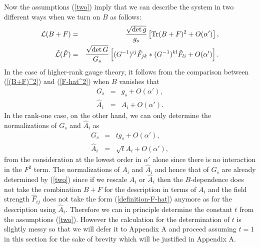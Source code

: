 \documentclass[a4paper,12pt]{article}
\begin{document}
Now the assumptions (\ref{two}) imply that
we can describe the system
in two different ways when we turn on $B$
as follows:
\begin{eqnarray}
{\cal L} (B+F)
&=& \frac{\sqrt{\det g}}{g_s} \left[
{\rm Tr} (B+F)^2
+ O(\alpha') \right],
\label{(B+F)^2} \\
\hat{{\cal L}} (\hat{F})
&=& \frac{\sqrt{\det G}}{G_s} \left[
(G^{-1})^{ij} \hat{F}_{jk} \ast (G^{-1})^{kl} \hat{F}_{li}
+ O(\alpha') \right].
\label{F-hat^2}
\end{eqnarray}
In the case of higher-rank gauge theory, it follows from
the comparison between (\ref{(B+F)^2}) and (\ref{F-hat^2})
when $B$ vanishes that
\begin{eqnarray}
G_s &=& g_s + O(\alpha'),
\label{G_s-lowest} \\
\hat{A}_i &=& A_i + O(\alpha').
\label{A-hat-lowest}
\end{eqnarray}
In the rank-one case, on the other hand, we can only determine
the normalizations of $G_s$ and $\hat{A}_i$ as
\begin{eqnarray}
G_s &=& t g_s + O(\alpha'),
\label{G_s-0}
\\
\hat{A}_i &=&  \sqrt{t} A_i + O(\alpha'),
\label{U1}
\end{eqnarray}
        from the consideration at the lowest order
in $\alpha'$ alone
since there is no interaction in the $F^2$ term.
The normalizations of $A_i$ and $\hat{A}_i$
and hence that of $G_s$ are already determined by (\ref{two})
since if we rescale $A_i$ or $\hat{A}_i$ then the $B$-dependence
does not take the combination $B+F$ for the description
in terms of $A_i$
and the field strength $\hat{F}_{ij}$ does not take the form
(\ref{definition-F-hat}) anymore
as for the description using $\hat{A}_i$.
Therefore we can in principle determine the constant $t$ from
the assumptions (\ref{two}).
However the calculation for the determination of $t$ is
slightly messy so that
we will defer it to Appendix A
and proceed assuming $t=1$ in this section
for the sake of brevity
which will be justified in Appendix A.
\end{document}
